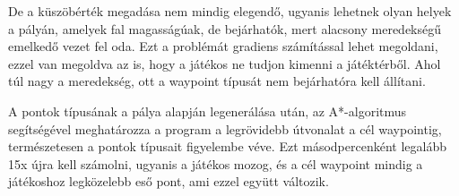 De a küszöbérték megadása nem mindig elegendő, ugyanis lehetnek olyan helyek a pályán, amelyek fal magasságúak, de bejárhatók, mert alacsony meredekségű emelkedő vezet fel oda. Ezt a problémát gradiens számítással lehet megoldani, ezzel van megoldva az is, hogy a játékos ne tudjon kimenni a játéktérből. Ahol túl nagy a meredekség, ott a waypoint típusát nem bejárhatóra kell állítani.

A pontok típusának a pálya alapján legenerálása után, az A*-algoritmus segítségével meghatározza a program a legrövidebb útvonalat a cél waypointig, természetesen a pontok típusait figyelembe véve. Ezt másodpercenként legalább 15x újra kell számolni, ugyanis a játékos mozog, és a cél waypoint mindig a játékoshoz legközelebb eső pont, ami ezzel együtt változik.
